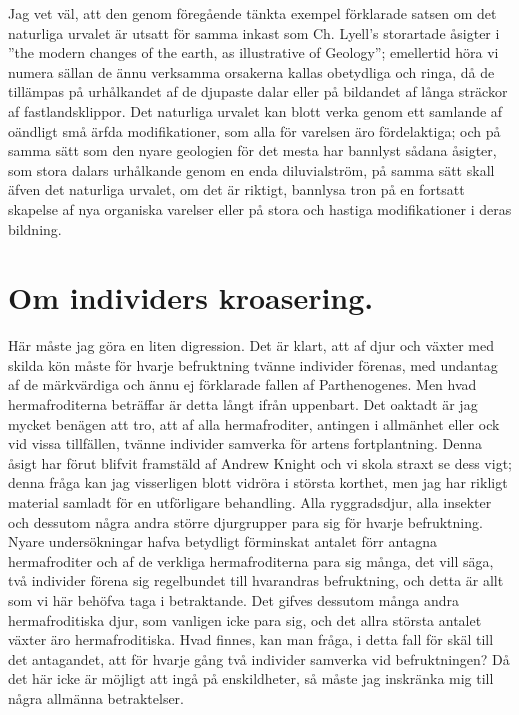 Jag vet väl, att den genom föregående tänkta exempel förklarade satsen om det naturliga urvalet är utsatt för samma inkast som Ch. Lyell’s storartade åsigter i ”the modern changes of the earth, as illustrative of Geology”; emellertid höra vi numera sällan de ännu verksamma orsakerna kallas obetydliga och ringa, då de tillämpas på urhålkandet af de djupaste dalar eller på bildandet af långa sträckor af fastlandsklippor. Det naturliga urvalet kan blott verka genom ett samlande af oändligt små ärfda modifikationer, som alla för varelsen äro fördelaktiga; och på samma sätt som den nyare geologien för det mesta har bannlyst sådana åsigter, som stora dalars urhålkande genom en enda diluvialström, på samma sätt skall äfven det naturliga urvalet, om det är riktigt, bannlysa tron på en fortsatt skapelse af nya organiska varelser eller på stora och hastiga modifikationer i deras bildning.



\section{Om individers kroasering.}

Här måste jag göra en liten digression. Det är klart, att af djur och växter med skilda kön måste för hvarje befruktning tvänne individer förenas, med undantag af de märkvärdiga och ännu ej förklarade fallen af Parthenogenes. Men hvad hermafroditerna beträffar är detta långt ifrån uppenbart. Det oaktadt är jag mycket benägen att tro, att af alla hermafroditer, antingen i allmänhet eller ock vid vissa tillfällen, tvänne individer samverka för artens fortplantning. Denna åsigt har förut blifvit framstäld af Andrew Knight och vi skola straxt se dess vigt; denna fråga kan jag visserligen blott vidröra i största korthet, men jag har rikligt material samladt för en utförligare behandling. Alla ryggradsdjur, alla insekter och dessutom några andra större djurgrupper para sig för hvarje befruktning. Nyare undersökningar hafva betydligt förminskat antalet förr antagna hermafroditer och af de verkliga hermafroditerna para sig många, det vill säga, två individer förena sig regelbundet till hvarandras befruktning, och detta är allt som vi här behöfva taga i betraktande. Det gifves dessutom många andra hermafroditiska djur, som vanligen icke para sig, och det allra största antalet växter äro hermafroditiska. Hvad finnes, kan man fråga, i detta fall för skäl till det antagandet, att för hvarje gång två individer samverka vid befruktningen? Då det här icke är möjligt att ingå på enskildheter, så måste jag inskränka mig till några allmänna betraktelser.

